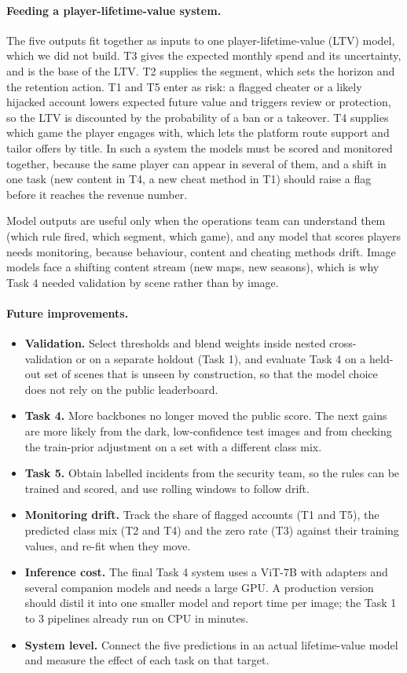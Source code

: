 \paragraph{Feeding a player-lifetime-value system.} The five outputs fit together as inputs to one player-lifetime-value (LTV) model, which we did not build. T3 gives the expected monthly spend and its uncertainty, and is the base of the LTV. T2 supplies the segment, which sets the horizon and the retention action. T1 and T5 enter as risk: a flagged cheater or a likely hijacked account lowers expected future value and triggers review or protection, so the LTV is discounted by the probability of a ban or a takeover. T4 supplies which game the player engages with, which lets the platform route support and tailor offers by title. In such a system the models must be scored and monitored together, because the same player can appear in several of them, and a shift in one task (new content in T4, a new cheat method in T1) should raise a flag before it reaches the revenue number.

Model outputs are useful only when the operations team can understand them (which rule fired, which segment, which game), and any model that scores players needs monitoring, because behaviour, content and cheating methods drift. Image models face a shifting content stream (new maps, new seasons), which is why Task 4 needed validation by scene rather than by image.

\paragraph{Future improvements.}
\begin{itemize}[leftmargin=*,itemsep=2pt]
\item \textbf{Validation.} Select thresholds and blend weights inside nested cross-validation or on a separate holdout (Task 1), and evaluate Task 4 on a held-out set of scenes that is unseen by construction, so that the model choice does not rely on the public leaderboard.
\item \textbf{Task 4.} More backbones no longer moved the public score. The next gains are more likely from the dark, low-confidence test images and from checking the train-prior adjustment on a set with a different class mix.
\item \textbf{Task 5.} Obtain labelled incidents from the security team, so the rules can be trained and scored, and use rolling windows to follow drift.
\item \textbf{Monitoring drift.} Track the share of flagged accounts (T1 and T5), the predicted class mix (T2 and T4) and the zero rate (T3) against their training values, and re-fit when they move.
\item \textbf{Inference cost.} The final Task 4 system uses a ViT-7B with adapters and several companion models and needs a large GPU. A production version should distil it into one smaller model and report time per image; the Task 1 to 3 pipelines already run on CPU in minutes.
\item \textbf{System level.} Connect the five predictions in an actual lifetime-value model and measure the effect of each task on that target.
\end{itemize}
